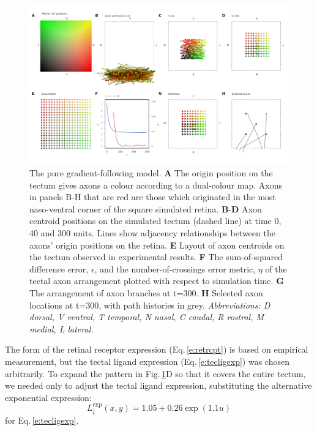 \documentclass[11pt, a4paper]{article}
\begin{document}
\begin{figure}
\includegraphics[width=\linewidth]{./images/j4_ee_G_wt_fig2.png}
\caption{The pure gradient-following model. \textbf{A} The origin position
on the tectum gives axons a colour according to a dual-colour map. Axons in
panels B-H that are red are those which originated in the most naso-ventral
corner of the square simulated retina. \textbf{B}-\textbf{D} Axon centroid
positions on the simulated tectum (dashed line) at time 0, 40 and 300
units. Lines show adjacency relationships between the axons' origin positions
on the retina. \textbf{E} Layout of axon centroids on the tectum observed in
experimental results. \textbf{F} The sum-of-squared difference error,
$\epsilon$, and the number-of-crossings error metric, $\eta$ of the tectal axon
arrangement plotted with respect to simulation time. \textbf{G} The
arrangement of axon branches at t=300. \textbf{H} Selected axon locations at
t=300, with path histories in grey.  \emph{Abbreviations: D dorsal, V ventral, T
temporal, N nasal, C caudal, R rostral, M medial, L lateral.}}
\label{f:ch}
\end{figure}

The form of the retinal receptor expression (Eq.\,\ref{e:retrcpt}) is based on
empirical measurement, but the tectal ligand expression
(Eq.\,\ref{e:tecligexp}) was chosen arbitrarily. To expand the pattern in
Fig.\,\ref{f:ch}D so that it covers the entire tectum, we needed only to
adjust the tectal ligand expression, substituting the alternative exponential
expression:
%
\begin{equation} \label{e:tecligexp2}
L_i^{\text{exp}}(x,y) = 1.05 + 0.26 \exp(1.1 u)
\end{equation}
%
for Eq.\,\ref{e:tecligexp}.
\end{document}
